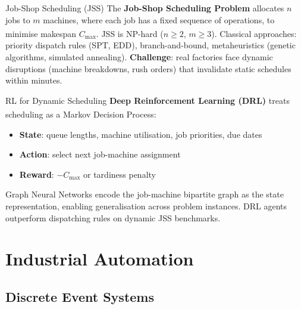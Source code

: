 \begin{v3topic}{Job-Shop Scheduling (JSS)}
    The \textbf{Job-Shop Scheduling Problem} allocates $n$ jobs to $m$ machines, where each job has a fixed sequence of operations, to minimise makespan $C_{\max}$\textsuperscript{\cite[][pp.~1--5]{panJobShopSchedulingRL2021}}.
    JSS is NP-hard ($n \geq 2$, $m \geq 3$).
    Classical approaches: priority dispatch rules (SPT, EDD), branch-and-bound, metaheuristics (genetic algorithms, simulated annealing).
    \textbf{Challenge}: real factories face dynamic disruptions (machine breakdowns, rush orders) that invalidate static schedules within minutes.

\end{v3topic}
\begin{v3topic}{RL for Dynamic Scheduling}
    \textbf{Deep Reinforcement Learning (DRL)} treats scheduling as a Markov Decision Process\textsuperscript{\cite[][pp.~3--6]{panJobShopSchedulingRL2021}}:
    \begin{itemize}
        \item \textbf{State}: queue lengths, machine utilisation, job priorities, due dates
        \item \textbf{Action}: select next job-machine assignment
        \item \textbf{Reward}: $-C_{\max}$ or tardiness penalty
    \end{itemize}
    Graph Neural Networks encode the job-machine bipartite graph as the state representation, enabling generalisation across problem instances.
    DRL agents outperform dispatching rules on dynamic JSS benchmarks.
\end{v3topic}

\section{Industrial Automation}

\subsection{Discrete Event Systems}

